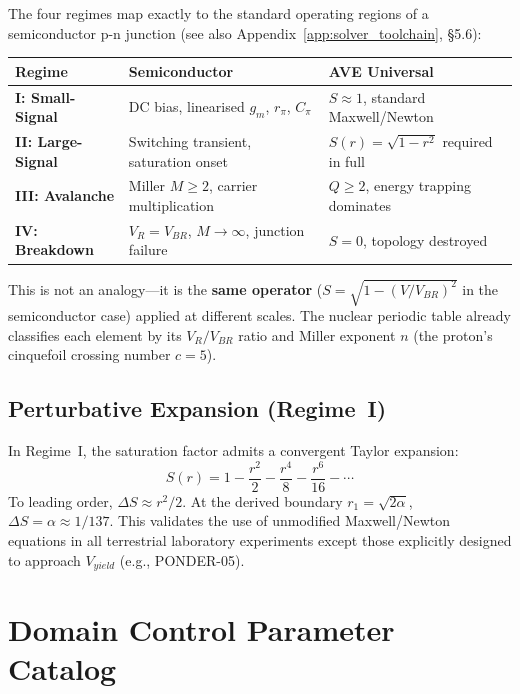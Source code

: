 The four regimes map exactly to the standard operating regions of a semiconductor p-n junction (see also Appendix~\ref{app:solver_toolchain}, \S5.6):

\begin{center}
\renewcommand{\arraystretch}{1.3}
\begin{tabular}{l p{5cm} p{5cm}}
\toprule
\textbf{Regime} & \textbf{Semiconductor} & \textbf{AVE Universal} \\
\midrule
\textbf{I: Small-Signal} &
  DC bias, linearised $g_m$, $r_\pi$, $C_\pi$ &
  $S \approx 1$, standard Maxwell/Newton \\
\textbf{II: Large-Signal} &
  Switching transient, saturation onset &
  $S(r) = \sqrt{1-r^2}$ required in full \\
\textbf{III: Avalanche} &
  Miller $M \geq 2$, carrier multiplication &
  $Q \geq 2$, energy trapping dominates \\
\textbf{IV: Breakdown} &
  $V_R = V_{BR}$, $M \to \infty$, junction failure &
  $S = 0$, topology destroyed \\
\bottomrule
\end{tabular}
\end{center}

\noindent This is not an analogy---it is the \textbf{same operator} ($S = \sqrt{1 - (V/V_{BR})^2}$ in the semiconductor case) applied at different scales. The nuclear periodic table already classifies each element by its $V_R/V_{BR}$ ratio and Miller exponent $n$ (the proton's cinquefoil crossing number $c = 5$).

\subsection{Perturbative Expansion (Regime~I)}

In Regime~I, the saturation factor admits a convergent Taylor expansion:
\begin{equation}
    S(r) = 1 - \frac{r^2}{2} - \frac{r^4}{8} - \frac{r^6}{16} - \cdots
    \label{eq:S_taylor}
\end{equation}
To leading order, $\Delta S \approx r^2/2$. At the derived boundary $r_1 = \sqrt{2\alpha}$, $\Delta S = \alpha \approx 1/137$. This validates the use of unmodified Maxwell/Newton equations in all terrestrial laboratory experiments except those explicitly designed to approach $V_{yield}$ (e.g., PONDER-05).

\section{Domain Control Parameter Catalog}
\label{sec:domain_catalog}

